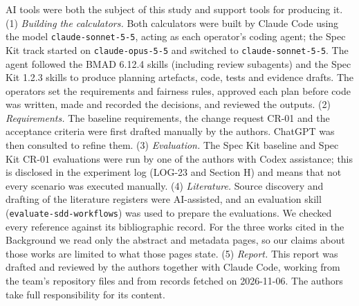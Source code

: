 \documentclass[conference]{IEEEtran}
\begin{document}
AI tools were both the subject of this study and support tools for
producing it. (1) \emph{Building the calculators.} Both calculators were
built by Claude Code using the model \texttt{claude-sonnet-5-5}, acting
as each operator's coding agent; the Spec Kit track started on
\texttt{claude-opus-5-5} and switched to \texttt{claude-sonnet-5-5}. The
agent followed the BMAD 6.12.4 skills (including review subagents) and
the Spec Kit 1.2.3 skills to produce planning artefacts, code, tests and
evidence drafts. The operators set the requirements and fairness rules,
approved each plan before code was written, made and recorded the
decisions, and reviewed the outputs. (2) \emph{Requirements.} The
baseline requirements, the change request CR-01 and the acceptance
criteria were first drafted manually by the authors. ChatGPT was then
consulted to refine them. (3) \emph{Evaluation.} The Spec Kit baseline
and Spec Kit CR-01 evaluations were run by one of the authors with Codex
assistance; this is disclosed in the experiment log (LOG-23 and Section
H) and means that not every scenario was executed manually. (4)
\emph{Literature.} Source discovery and drafting of the literature
registers were AI-assisted, and an evaluation skill
(\texttt{evaluate-sdd-workflows}) was used to prepare the evaluations.
We checked every reference against its bibliographic record. For the
three works cited in the Background we read only the abstract and
metadata pages, so our claims about those works are limited to what
those pages state. (5) \emph{Report.} This report was drafted and
reviewed by the authors together with Claude Code, working from the
team's repository files and from records fetched on 2026-11-06. The
authors take full responsibility for its content.



\end{document}
